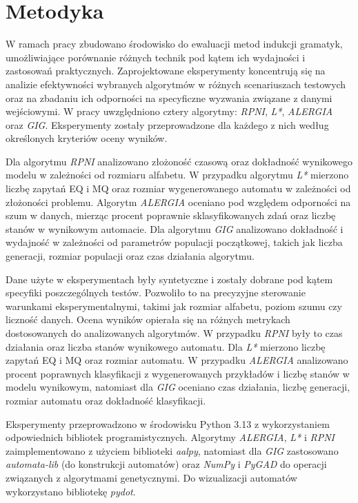 \chapter{Metodyka}
\label{cha:metodyka}


W ramach pracy zbudowano środowisko do ewaluacji metod indukcji gramatyk, umożliwiające porównanie różnych technik pod kątem ich wydajności i zastosowań praktycznych. Zaprojektowane eksperymenty koncentrują się na analizie efektywności wybranych algorytmów w różnych scenariuszach testowych oraz na zbadaniu ich odporności na specyficzne wyzwania związane z danymi wejściowymi. W pracy uwzględniono cztery algorytmy: \textit{RPNI}, \textit{L*}, \textit{ALERGIA} oraz \textit{GIG}. Eksperymenty zostały przeprowadzone dla każdego z nich według określonych kryteriów oceny wyników.

Dla algorytmu \textit{RPNI} analizowano złożoność czasową oraz dokładność wynikowego modelu w zależności od rozmiaru alfabetu. W przypadku algorytmu \textit{L*} mierzono liczbę zapytań EQ i MQ oraz rozmiar wygenerowanego automatu w zależności od złożoności problemu. Algorytm \textit{ALERGIA} oceniano pod względem odporności na szum w danych, mierząc procent poprawnie sklasyfikowanych zdań oraz liczbę stanów w wynikowym automacie. Dla algorytmu \textit{GIG} analizowano dokładność i wydajność w zależności od parametrów populacji początkowej, takich jak liczba generacji, rozmiar populacji oraz czas działania algorytmu. 

Dane użyte w eksperymentach były syntetyczne i zostały dobrane pod kątem specyfiki poszczególnych testów. Pozwoliło to na precyzyjne sterowanie warunkami eksperymentalnymi, takimi jak rozmiar alfabetu, poziom szumu czy liczność danych. Ocena wyników opierała się na różnych metrykach dostosowanych do analizowanych algorytmów. W przypadku \textit{RPNI} były to czas działania oraz liczba stanów wynikowego automatu. Dla \textit{L*} mierzono liczbę zapytań EQ i MQ oraz rozmiar automatu. W przypadku \textit{ALERGIA} analizowano procent poprawnych klasyfikacji z wygenerowanych przykładów i liczbę stanów w modelu wynikowym, natomiast dla \textit{GIG} oceniano czas działania, liczbę generacji, rozmiar automatu oraz dokładność klasyfikacji.

Eksperymenty przeprowadzono w środowisku Python 3.13 z wykorzystaniem odpowiednich bibliotek programistycznych. Algorytmy \textit{ALERGIA}, \textit{L*} i \textit{RPNI} zaimplementowano z użyciem biblioteki \textit{aalpy}, natomiast dla \textit{GIG} zastosowano \textit{automata-lib} (do konstrukcji automatów) oraz \textit{NumPy} i \textit{PyGAD} do operacji związanych z algorytmami genetycznymi. Do wizualizacji automatów wykorzystano bibliotekę \textit{pydot}.

